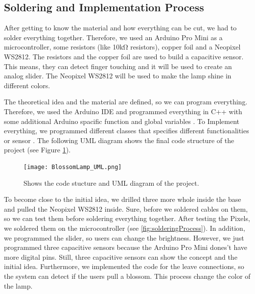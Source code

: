 \documentclass[00_doc.tex]{subfiles}
\begin{document}
    \subsection{Soldering and Implementation Process}
    \begin{flushleft}
        After getting to know the material and how everything can be cut, we had to 
        solder everything together. Therefore, we used an Arduino Pro Mini \cite{arduinoProMini} 
        as a microcontroller, some resistors (like 10k\si{\ohm} resistors), copper foil and a Neopixel WS2812. \newline
        The resistors and the copper foil are used to build a capacitive sensor. \cite{Badger2019} 
        This means, they can detect finger touching and it will be used to create an analog slider.
        The Neopixel WS2812 will be used to make the lamp shine in different colors. \cite{Burgess2019} 
        \newline 
        \noindent

        The theoretical idea and the material are defined, so we can program everything. Therefore,
        we used the Arduino IDE and programmed everything in C++ with some additional Arduino spacific 
        function and global variables \cite{introductionArduino}. To Implement everything, we programmed
        different classes that specifies different functionalities or sensor \cite{arduinoClasses}. The 
        following UML diagram shows the final code structure of the project (see Figure \ref{fig:UMLDiagram}).

        \begin{figure}[H]
            \centering
            \texttt{[image: BlossomLamp\_UML.png]}
            \caption{Shows the code stucture and UML diagram of the project.}
            \label{fig:UMLDiagram}
        \end{figure}

        
        \noindent
        To become close to the initial idea, we drilled three more whole inside the base and 
        pulled the Neopixel WS2812 inside. Sure, before we soldered cables on them, so we can 
        test them before soldering everything together. After testing the Pixels, we soldered 
        them on the microcontroller (see \ref{fig:solderingProcess}). In addition, we programmed
        the slider, so users can change the brightness. However, we just programmed three capacitive
        sensors because the Arduino Pro Mini dones't have more digital pins. Still, three capacitive
        sensors can show the concept and the initial idea. Furthermore, we implemented the code for
        the leave connections, so the system can detect if the users pull a blossom. This process 
        change the color of the lamp.
    \end{flushleft}
\end{document}
